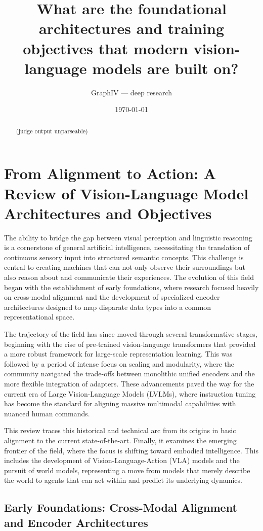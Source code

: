 \documentclass[11pt]{article}
\title{What are the foundational architectures and training objectives that modern vision-language models are built on?}
\author{GraphIV --- deep research}
\date{\today}
\begin{document}
\maketitle

\begin{abstract}
(judge output unparseable)
\end{abstract}

\section{From Alignment to Action: A Review of Vision-Language Model Architectures and Objectives}

The ability to bridge the gap between visual perception and linguistic reasoning is a cornerstone of general artificial intelligence, necessitating the translation of continuous sensory input into structured semantic concepts. This challenge is central to creating machines that can not only observe their surroundings but also reason about and communicate their experiences. The evolution of this field began with the establishment of early foundations, where research focused heavily on cross-modal alignment and the development of specialized encoder architectures designed to map disparate data types into a common representational space.

The trajectory of the field has since moved through several transformative stages, beginning with the rise of pre-trained vision-language transformers that provided a more robust framework for large-scale representation learning. This was followed by a period of intense focus on scaling and modularity, where the community navigated the trade-offs between monolithic unified encoders and the more flexible integration of adapters. These advancements paved the way for the current era of Large Vision-Language Models (LVLMs), where instruction tuning has become the standard for aligning massive multimodal capabilities with nuanced human commands.

This review traces this historical and technical arc from its origins in basic alignment to the current state-of-the-art. Finally, it examines the emerging frontier of the field, where the focus is shifting toward embodied intelligence. This includes the development of Vision-Language-Action (VLA) models and the pursuit of world models, representing a move from models that merely describe the world to agents that can act within and predict its underlying dynamics.

\subsection{Early Foundations: Cross-Modal Alignment and Encoder Architectures}
\end{document}
